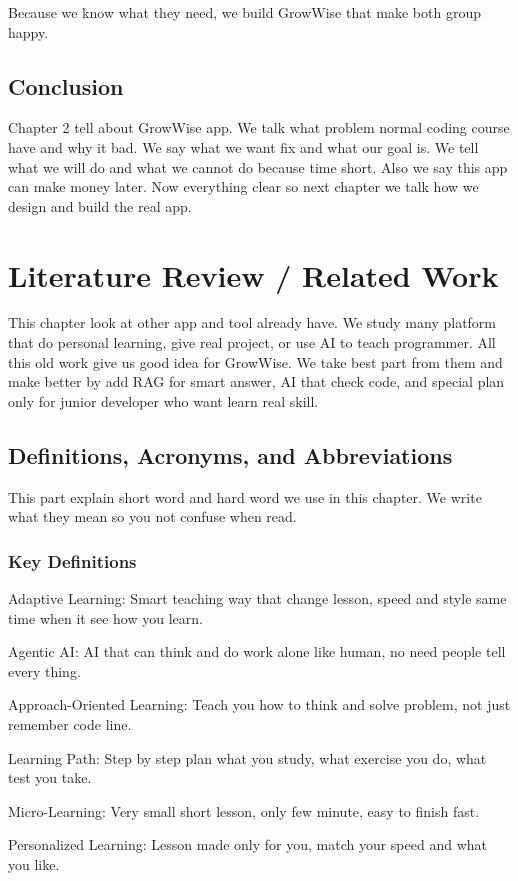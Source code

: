 \documentclass{FastFyp}
\begin{document}
Because we know what they need, we build GrowWise that make both group happy.
\section{Conclusion}

Chapter 2 tell about GrowWise app. We talk what problem normal coding course have and why it bad. We say what we want fix and what our goal is. We tell what we will do and what we cannot do because time short. Also we say this app can make money later. Now everything clear so next chapter we talk how we design and build the real app.
\chapter{Literature Review / Related Work}

This chapter look at other app and tool already have. We study many platform that do personal learning, give real project, or use AI to teach programmer. All this old work give us good idea for GrowWise. We take best part from them and make better by add RAG for smart answer, AI that check code, and special plan only for junior developer who want learn real skill.
\section{Definitions, Acronyms, and Abbreviations}

This part explain short word and hard word we use in this chapter. We write what they mean so you not confuse when read.

\subsection{Key Definitions}

Adaptive Learning: Smart teaching way that change lesson, speed and style same time when it see how you learn.

Agentic AI: AI that can think and do work alone like human, no need people tell every thing.

Approach-Oriented Learning: Teach you how to think and solve problem, not just remember code line.

Learning Path: Step by step plan what you study, what exercise you do, what test you take.

Micro-Learning: Very small short lesson, only few minute, easy to finish fast.

Personalized Learning: Lesson made only for you, match your speed and what you like.
\end{document}
